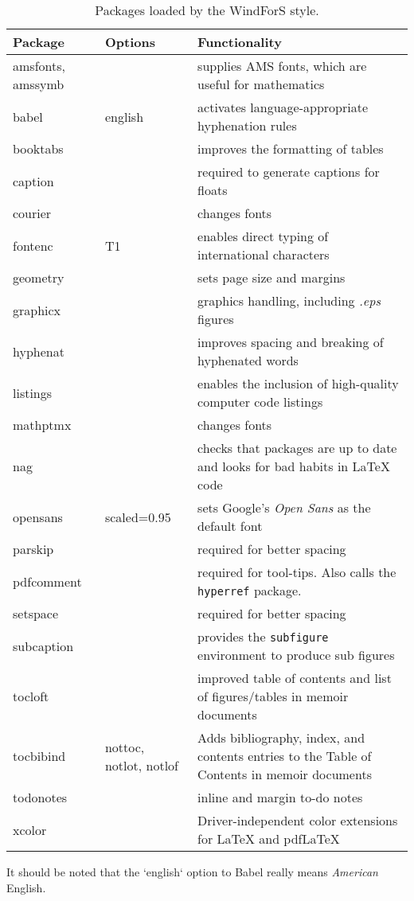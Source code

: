 \begin{table*}[!ht]
\centering
\caption[Packages loaded by the WindForS style]{Packages loaded by the WindForS style.}
\label{Tab:Packages}
\begin{tabular*}{\textwidth}{llp{}}
\toprule
Package & Options & Functionality\\
\midrule
amsfonts, amssymb & & supplies AMS fonts, which are useful for mathematics \\
babel & english & activates language-appropriate hyphenation rules\\
booktabs & & improves the formatting of tables \\
caption & & required to generate captions for floats\\
courier& & changes fonts \\
fontenc & T1 & enables direct typing of international characters \\
geometry & & sets page size and margins \\
graphicx & & graphics handling, including \emph{.eps} figures \\
hyphenat & & improves spacing and breaking of hyphenated words \\
listings & & enables the inclusion of high-quality computer code listings\\
mathptmx& & changes fonts \\
nag & & checks that packages are up to date and looks for bad habits in LaTeX code\\
opensans& scaled=0.95 & sets Google's \emph{Open Sans} as the default font\\
parskip & & required for better spacing\\
pdfcomment & & required for tool-tips. Also calls the \texttt{hyperref} package.\\
setspace & & required for better spacing\\
subcaption & & provides the \texttt{subfigure} environment to produce sub figures \\
tocloft & & improved table of contents and list of figures/tables in memoir documents\\
tocbibind & nottoc, notlot, notlof & Adds bibliography, index, and contents entries to the Table of Contents in memoir documents\\
todonotes & & inline and margin to-do notes \\
xcolor & & Driver-independent color extensions for LaTeX and pdfLaTeX\\
\bottomrule
\end{tabular*}
\end{table*}

It should be noted that the `english` option to Babel really means \emph{American} English.
